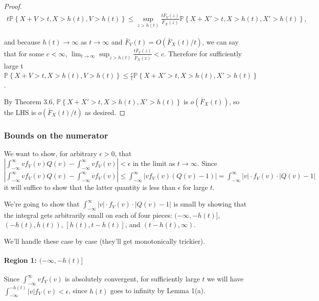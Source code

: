 \documentclass[../main.tex]{subfiles}
\begin{document}
\begin{proof}
\begin{multline} t \mathbb{P}\left\{X\!+\!V>t, X\!>\!h(t), V\!>\!h(t) \right\} \le \sup_{z > h(t)} \frac{t\bar F_V(z)}{\bar F_X(z)} {\mathbb{P}\left\{X\!+\!X'>t, X\!>\!h(t), X'\!>\!h(t)\right\}}, \end{multline}

and because \(h(t) \to\infty\) as \(t \to\infty\) and \(\bar F_V(t) = O(\bar F_X(t) / t)\), we can say that for some \(c < \infty\), \(\lim_{t \to\infty} \sup_{z > h(t)} \frac{t\bar F_V(z)}{\bar F_X(z)} < c\). Therefore for sufficiently large t \(\mathbb{P}\left\{X+V>t, X>h(t), V>h(t) \right\} \leq \frac c t {\mathbb{P}\left\{X\!+\!X'>t, X\!>\!h(t), X'\!>\!h(t)\right\}}\). 

By Theorem 3.6, \(\mathbb{P}\left\{X\!+\!X'>t, X\!>\!h(t), X'\!>\!h(t)\right\}\) is \(o(\bar F_X(t))\), so the LHS is \(o(\bar F_X(t)/t)\) as desired.
\end{proof}

\subsubsection{Bounds on the numerator}

We want to show, for arbitrary \(\epsilon>0\), that \(\left|\int_{-\infty}^\infty vf_V(v)Q(v) - \int_{-\infty}^\infty vf_V(v)\right|<\epsilon\) in the limit as \(t\to\infty\). Since \(\left|\int_{-\infty}^\infty vf_V(v)Q(v) - \int_{-\infty}^\infty vf_V(v)\right| \le \int_{-\infty}^\infty \left|vf_V(v)(Q(v) - 1)\right| = \int_{-\infty}^\infty |v| \cdot f_V(v) \cdot |Q(v) - 1|\) it will suffice to show that the latter quantity is less than \(\epsilon\) for large \(t\).

We're going to show that \(\int_{-\infty}^\infty |v|\cdot f_V(v)\cdot |Q(v) - 1|\) is small by showing that the integral gets arbitrarily small on each of four pieces: \((-\infty,-h(t)]\), \((-h(t),h(t))\), \([h(t),t-h(t)]\), and \((t-h(t),\infty)\).

We'll handle these case by case (they'll get monotonically trickier).

\paragraph{Region 1: \texorpdfstring{\((-\infty,-h(t)]\)}{}}
 Since \(\int_{-\infty}^\infty vf_V(v)\) is absolutely convergent, for sufficiently large \(t\) we will have \(\int_{-\infty}^{-h(t)} |v|f_V(v) < \epsilon\), since \(h(t)\) goes to infinity by Lemma 1(a).
\end{document}
